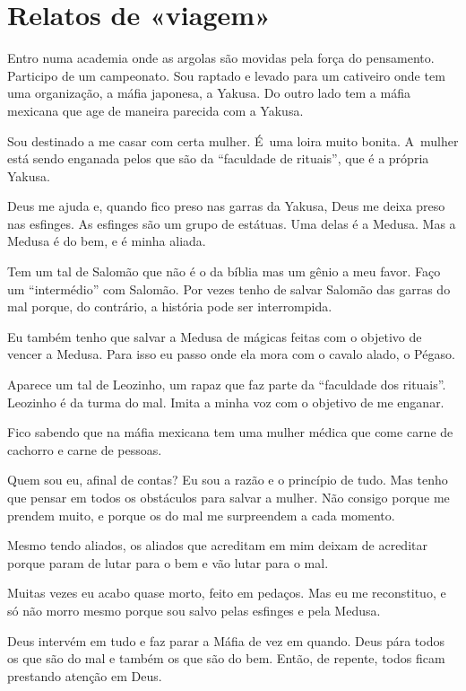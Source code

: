  

\section{Relatos de «viagem»}

Entro numa academia onde as argolas são movidas pela força do
pensamento. Participo de um campeonato. Sou raptado e levado para um
cativeiro onde tem uma organização, a máfia japonesa, a Yakusa. Do outro
lado tem a máfia mexicana que age de maneira parecida com a Yakusa.

Sou destinado a me casar com certa mulher. É~uma loira muito bonita. A~mulher está sendo enganada pelos que são da ``faculdade de rituais'',
que é a própria Yakusa.

Deus me ajuda e, quando fico preso nas garras da Yakusa, Deus me deixa
preso nas esfinges. As esfinges são um grupo de estátuas. Uma delas é a
Medusa. Mas a Medusa é do bem, e é minha aliada.

Tem um tal de Salomão que não é o da bíblia mas um gênio a meu favor.
Faço um ``intermédio'' com Salomão. Por vezes tenho de salvar Salomão
das garras do mal porque, do contrário, a história pode ser interrompida.

Eu também tenho que salvar a Medusa de mágicas feitas com o objetivo de
vencer a Medusa. Para isso eu passo onde ela mora com o cavalo alado, o
Pégaso.

Aparece um tal de Leozinho, um rapaz que faz parte da ``faculdade dos
rituais''. Leozinho é da turma do mal. Imita a minha voz com o objetivo
de me enganar.

Fico sabendo que na máfia mexicana tem uma mulher médica que come carne
de cachorro e carne de pessoas.

Quem sou eu, afinal de contas? Eu sou a razão e o princípio de tudo. Mas
tenho que pensar em todos os obstáculos para salvar a mulher. Não
consigo porque me prendem muito, e porque os do mal me surpreendem a
cada momento.

Mesmo tendo aliados, os aliados que acreditam em mim deixam de acreditar
porque param de lutar para o bem e vão lutar para o mal.

Muitas vezes eu acabo quase morto, feito em pedaços. Mas eu me
reconstituo, e só não morro mesmo porque sou salvo pelas esfinges e pela
Medusa.

Deus intervém em tudo e faz parar a Máfia de vez em quando. Deus pára
todos os que são do mal e também os que são do bem. Então, de repente,
todos ficam prestando atenção em Deus.


